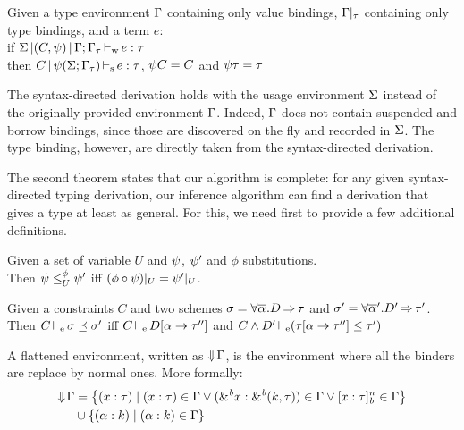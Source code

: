 \begin{theorem}
  Given a type environment $\E$ containing only value bindings,
  $\E|_\tau$ containing only type bindings, and a term $e$:\\
  if $\inferW{\Sv}{(C,\unif)}{\E;\E_\tau}{e}{\tau}$\\
  then $\inferS{C}{\unif(\Sv;\E_\tau)}{e}{\tau}$, $\unif C = C$ and $\unif \tau = \tau$
\end{theorem}

The syntax-directed derivation holds with the usage environment $\Sv$ instead of the originally provided environment $\E$. Indeed,
$\E$ does not contain suspended and borrow bindings, since those
are discovered on the fly and recorded in $\Sv$. The type binding, however,
are directly taken from the syntax-directed derivation.

The second theorem states that our algorithm is complete: for any given
syntax-directed typing derivation, our inference algorithm can find
a derivation that gives a type at least as general.
For this, we need first to provide a few additional definitions.

\begin{definition}
  Given a set of variable $U$ and $\unif$, $\unif'$ and $\phi$
  substitutions. \\
  Then
  $\unif \leq^{\phi}_{U} \unif'$ iff $(\phi \circ \unif)|_{U} = \unif'|_U$.
\end{definition}

\begin{definition}
  Given a constraints $C$ and two schemes
  $\schm = \forall \Multi\tvar. \qual{D}{\tau}$ and
  $\schm' = \forall \Multi\tvar'. \qual{D'}{\tau'} $.
  Then $\entail{C}{\schm \preceq \schm'}$
  iff $\entail{C}{\subst{\tvar}{\tau''} D}$
  and $\entail{C\Cand D'}{\Cleq{\subst{\tvar}{\tau''}\tau}{\tau'}}$
\end{definition}

\begin{definition}
A flattened environment,
written as $\Eflat\E$, is the environment
where all the binders are replace by normal ones. More formally:
\begin{align*}
  \Eflat\E
  &= \left\{ \bvar{x}{\tau} \mid
    \bvar{x}{\tau}\in\E
    \vee \bvar{\borrow{x}}{\borrowty{k}{\tau}}\in\E
    \vee \svar{x}{\tau}^n\in\E
    \right\}\\
  &\cup \left\{ \bvar{\tvar}{k} \mid \bvar{\tvar}{k}\in\E \right\}
\end{align*}
\end{definition}


